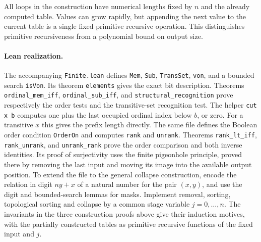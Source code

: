 All loops in the construction have numerical lengths fixed by $n$ and
the already computed table. Values can grow rapidly, but appending the
next value to the current table is a single fixed primitive recursive
operation. This distinguishes primitive recursiveness from a polynomial
bound on output size.

\paragraph{Lean realization.}
The accompanying \texttt{Finite.lean} defines \texttt{Mem}, \texttt{Sub},
\texttt{TransSet}, \texttt{von}, and a bounded search
\texttt{isVon}. Its theorem \texttt{elements} gives the exact bit
description. Theorems \texttt{ordinal\_mem\_iff},
\texttt{ordinal\_sub\_iff}, and \texttt{structural\_recognition}
prove respectively the order tests and the transitive-set recognition test.
The helper \texttt{cut x b} computes one plus the last occupied ordinal
index below $b$, or zero. For a transitive $x$ this gives the prefix
length directly. The same file defines the Boolean order condition \texttt{OrderOn} and computes \texttt{rank} and \texttt{unrank}. Theorems \texttt{rank\_lt\_iff}, \texttt{rank\_unrank}, and \texttt{unrank\_rank} prove the order comparison and both inverse identities. Its proof of surjectivity uses the finite pigeonhole principle, proved there by removing the last input and moving its image into the available output position. To extend the file to the general collapse construction,
encode the relation in digit $ny+x$ of a natural number for the pair
$(x,y)$, and use the digit and bounded-search lemmas for masks.
Implement removal, sorting, topological sorting and collapse by a common
stage variable $j=0,\ldots,n$. The invariants in the three construction
proofs above give their induction motives, with the partially constructed
tables as primitive recursive functions of the fixed input and $j$.
